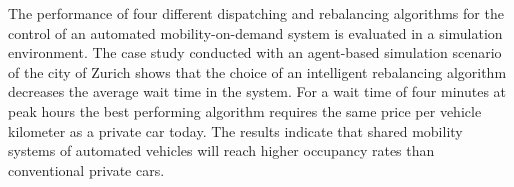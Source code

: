 The performance of four different dispatching and rebalancing algorithms for the
control of an automated mobility-on-demand system is evaluated in a simulation environment.
The case study conducted with an agent-based simulation scenario of the city of Zurich
shows that the choice of an intelligent rebalancing algorithm decreases the average
 wait time in the system. For a wait time of four minutes at peak hours the best performing algorithm requires the same price
per vehicle kilometer as a private car today.
The results indicate that shared mobility systems of automated vehicles will reach higher occupancy rates than conventional private cars.
